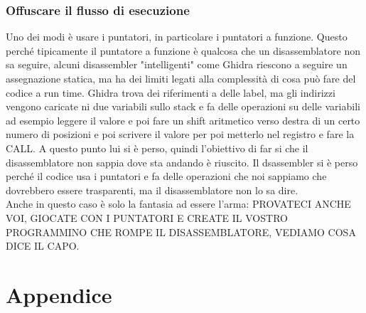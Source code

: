\documentclass[12pt, oneside]{extbook}
\begin{document}
\subsection{Offuscare il flusso di esecuzione}
Uno dei modi è usare i puntatori, in particolare i puntatori a funzione. Questo perché tipicamente il puntatore a funzione è qualcosa che un disassemblatore non sa seguire, alcuni disassembler "intelligenti" come Ghidra riescono a seguire un assegnazione statica, ma ha dei limiti legati alla complessità di cosa può fare del codice a run time. Ghidra trova dei riferimenti a delle label, ma gli indirizzi vengono caricate ni due variabili sullo stack e fa delle operazioni su delle variabili ad esempio leggere il valore e poi fare un shift aritmetico verso destra di un certo numero di posizioni e poi scrivere il valore per poi metterlo nel registro e fare la CALL. A questo punto lui si è perso, quindi l'obiettivo di far si che il disassemblatore non sappia dove sta andando è riuscito. Il dsassembler si è perso perché il codice usa i puntatori e fa delle operazioni che noi sappiamo che dovrebbero essere trasparenti, ma il disassemblatore non lo sa dire.\\Anche in questo caso è solo la fantasia ad essere l'arma: PROVATECI ANCHE VOI, GIOCATE CON I PUNTATORI E CREATE IL VOSTRO PROGRAMMINO CHE ROMPE IL DISASSEMBLATORE, VEDIAMO COSA DICE IL CAPO.








\newpage
\chapter*{Appendice}
\end{document}
